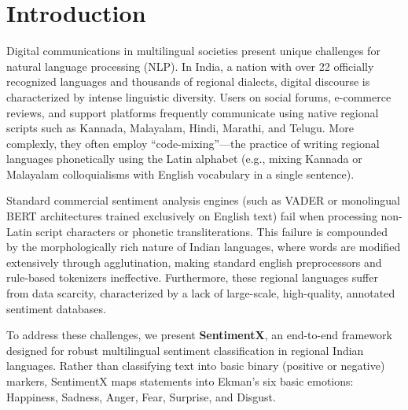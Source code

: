 \documentclass[conference]{IEEEtran}
\begin{document}
\section{Introduction}
Digital communications in multilingual societies present unique challenges for natural language processing (NLP). In India, a nation with over 22 officially recognized languages and thousands of regional dialects, digital discourse is characterized by intense linguistic diversity. Users on social forums, e-commerce reviews, and support platforms frequently communicate using native regional scripts such as Kannada, Malayalam, Hindi, Marathi, and Telugu. More complexly, they often employ ``code-mixing''---the practice of writing regional languages phonetically using the Latin alphabet (e.g., mixing Kannada or Malayalam colloquialisms with English vocabulary in a single sentence). 

Standard commercial sentiment analysis engines (such as VADER or monolingual BERT architectures trained exclusively on English text) fail when processing non-Latin script characters or phonetic transliterations. This failure is compounded by the morphologically rich nature of Indian languages, where words are modified extensively through agglutination, making standard english preprocessors and rule-based tokenizers ineffective. Furthermore, these regional languages suffer from data scarcity, characterized by a lack of large-scale, high-quality, annotated sentiment databases.

To address these challenges, we present \textbf{SentimentX}, an end-to-end framework designed for robust multilingual sentiment classification in regional Indian languages. Rather than classifying text into basic binary (positive or negative) markers, SentimentX maps statements into Ekman's six basic emotions: Happiness, Sadness, Anger, Fear, Surprise, and Disgust. 
\end{document}
